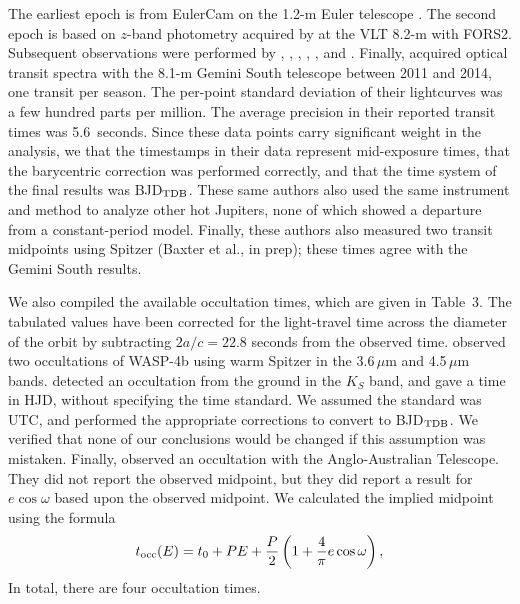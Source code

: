 \documentclass[12pt,twocolumn,tighten]{aastex62}
\begin{document}
{The earliest epoch is from EulerCam on the 1.2-m Euler telescope
\citep{wilson_wasp-4b_2008}.  The second epoch is based on $z$-band
photometry acquired by \citet{gillon_improved_2009} at the VLT 8.2-m
with FORS2.  Subsequent observations were performed by
\citet{winn_transit_2009}, \citet{dragomir_terms_2011},
\citet{sanchis-ojeda_starspots_2011}, \citet{nikolov_wasp-4b_2012},
\citet{hoyer_tramos_2013}, and \citet{ranjan_atmospheric_2014}.
Finally, \citet{huitson_gemini_2017} acquired optical transit spectra
with the 8.1-m Gemini South telescope between 2011 and 2014, one
transit per season.  The per-point standard deviation of their
lightcurves was a few hundred parts per million.  The average
precision in their reported transit times was 5.6~seconds.  Since
these data points carry significant weight in the analysis, we
 that the
timestamps in their data represent mid-exposure times, that the
barycentric correction was performed correctly, and that the time
system of the final results was BJD$_{\rm TDB}$.  These same authors
also used the same instrument and method to analyze other hot
Jupiters, none of which showed a departure from a constant-period
model.  Finally, these authors also measured two transit midpoints
using Spitzer (Baxter et al., in prep); these times agree with the
Gemini South results.

We also compiled the available occultation times, which are given in
Table~3.  The tabulated values have been corrected for the
light-travel time across the diameter of the orbit by subtracting
$2a/c = 22.8$ seconds from the observed time.
\citet{beerer_secondary_2011} observed two occultations of WASP-4b
using warm Spitzer in the 3.6\,$\mu$m and 4.5\,$\mu$m bands.
\citet{caceres_ground-based_2011} detected an occultation from the
ground in the $K_S$ band, and gave a time in HJD, without specifying
the time standard.  We assumed the standard was UTC, and performed the
appropriate corrections to convert to BJD$_{\rm TDB}$.  We verified
that none of our conclusions would be changed if this assumption was
mistaken. Finally, \citet{zhou_secondary_2015} observed an occultation
with the Anglo-Australian Telescope.  They did not report the observed
midpoint, but they did report a result for $e\cos\omega$ based upon
the observed midpoint.  We calculated the implied midpoint using the
formula \citep[{\it e.g.},][]{winn_exoplanet_2010}
\begin{equation}
  t_{\rm occ}(E) =
  t_0 +  P E  +
  \frac{P}{2} \left( 1 + \frac{4}{\pi} e\cos\omega \right),
  \label{eq:occultation_time}
\end{equation}
 In total,
there are four  occultation times.


}
\end{document}
